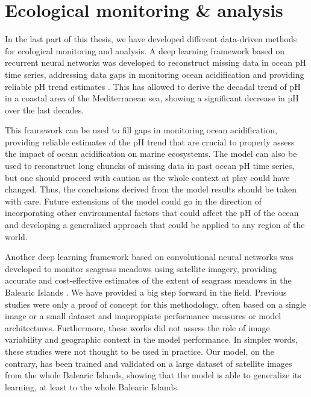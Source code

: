 \section{Ecological monitoring \& analysis}

In the last part of this thesis, we have developed different data-driven
methods for ecological monitoring and analysis. A deep learning framework based
on recurrent neural networks was developed to reconstruct missing data in ocean
pH time series, addressing data gaps in monitoring ocean acidification and
providing reliable pH trend estimates \cite{Flecha2022}. This has allowed to
derive the decadal trend of pH in a coastal area of the Mediterranean sea,
showing a significant decrease in pH over the last decades.

This framework can be used to fill gaps in monitoring ocean acidification,
providing reliable estimates of the pH trend that are crucial to properly
assess the impact of ocean acidification on marine ecosystems. The model can
also be used to reconstruct long chuncks of missing data in past ocean pH time
series, but one should proceed with caution as the whole context at play could
have changed. Thus, the conclusions derived from the model results should be
taken with care. Future extensions of the model could go in the direction of
incorporating other environmental factors that could affect the pH of the ocean
and developing a generalized approach that could be applied to any region of
the world.

Another deep learning framework based on convolutional neural networks was
developed to monitor seagrass meadows using satellite imagery, providing
accurate and cost-effective estimates of the extent of seagrass meadows in the
Balearic Islands \cite{GimenezRomero2024_posi}. We have provided a big step
forward in the field. Previous studies were only a proof of concept for this
methodology, often based on a single image or a small dataset and inaproppiate
performance measures or model architectures. Furthermore, these works did not
assess the role of image variability and geographic context in the model
performance. In simpler words, these studies were not thought to be used in
practice. Our model, on the contrary, has been trained and validated on a large
dataset of satellite images from the whole Balearic Islands, showing that the
model is able to generalize its learning, at least to the whole Balearic
Islands.

